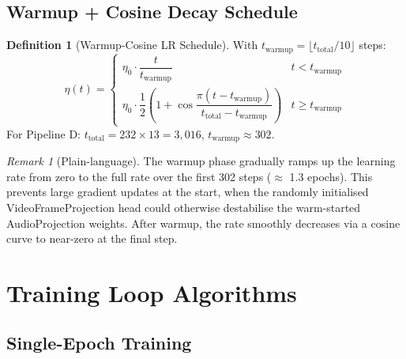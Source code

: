 \documentclass[12pt,a4paper]{article}
\theoremstyle{definition}
\newtheorem{definition}[theorem]{Definition}
\theoremstyle{remark}
\newtheorem{remark}[theorem]{Remark}
\begin{document}
\subsection{Warmup + Cosine Decay Schedule}

\begin{definition}[Warmup-Cosine LR Schedule]
With $t_{\text{warmup}} = \lfloor t_{\text{total}} / 10 \rfloor$ steps:
\[
  \eta(t) = \begin{cases}
    \eta_0 \cdot \dfrac{t}{t_{\text{warmup}}} & t < t_{\text{warmup}} \\[8pt]
    \eta_0 \cdot \dfrac{1}{2}\!\left(1 + \cos\dfrac{\pi(t - t_{\text{warmup}})}{t_{\text{total}} - t_{\text{warmup}}}\right)
    & t \geq t_{\text{warmup}}
  \end{cases}
\]
For Pipeline D: $t_{\text{total}} = 232 \times 13 = 3{,}016$, $t_{\text{warmup}} \approx 302$.
\end{definition}

\begin{remark}[Plain-language]
The warmup phase gradually ramps up the learning rate from zero to the
full rate over the first 302 steps ($\approx$ 1.3 epochs). This prevents
large gradient updates at the start, when the randomly initialised
VideoFrameProjection head could otherwise destabilise the warm-started
AudioProjection weights. After warmup, the rate smoothly decreases via
a cosine curve to near-zero at the final step.
\end{remark}

\section{Training Loop Algorithms}

\subsection{Single-Epoch Training}
\end{document}

